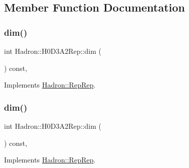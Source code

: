 \subsection{Member Function Documentation}
\mbox{\label{structHadron_1_1H0D3A2Rep_ac1e8bf30c08358a2d9c24c5cf8c767a7}} 
\subsubsection{\texorpdfstring{dim()}{dim()}\hspace{0.1cm}{\footnotesize\ttfamily [1/5]}}
{\footnotesize\ttfamily int Hadron\+::\+H0\+D3\+A2\+Rep\+::dim (\begin{DoxyParamCaption}{ }\end{DoxyParamCaption}) const\hspace{0.3cm}{\ttfamily [inline]}, {\ttfamily [virtual]}}



Implements \mbox{\hyperlink{structHadron_1_1RepRep_a92c8802e5ed7afd7da43ccfd5b7cd92b}{Hadron\+::\+Rep\+Rep}}.

\mbox{\label{structHadron_1_1H0D3A2Rep_ac1e8bf30c08358a2d9c24c5cf8c767a7}} 
\subsubsection{\texorpdfstring{dim()}{dim()}\hspace{0.1cm}{\footnotesize\ttfamily [2/5]}}
{\footnotesize\ttfamily int Hadron\+::\+H0\+D3\+A2\+Rep\+::dim (\begin{DoxyParamCaption}{ }\end{DoxyParamCaption}) const\hspace{0.3cm}{\ttfamily [inline]}, {\ttfamily [virtual]}}



Implements \mbox{\hyperlink{structHadron_1_1RepRep_a92c8802e5ed7afd7da43ccfd5b7cd92b}{Hadron\+::\+Rep\+Rep}}.

\mbox{\label{structHadron_1_1H0D3A2Rep_ac1e8bf30c08358a2d9c24c5cf8c767a7}} 
